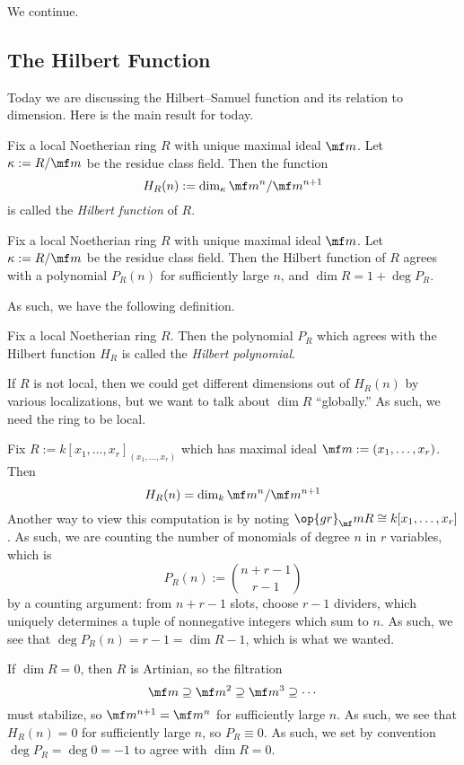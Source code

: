 
We continue.

\subsection{The Hilbert Function}
Today we are discussing the Hilbert--Samuel function and its relation to dimension. Here is the main result for today.
\begin{definition}
	Fix a local Noetherian ring $R$ with unique maximal ideal $\mf m$. Let $\kappa:=R/\mf m$ be the residue class field. Then the function
	\[H_R(n):=\dim_\kappa\mf m^n/\mf m^{n+1}\]
	is called the \textit{Hilbert function} of $R$.
\end{definition}
\begin{theorem} \label{thm:hilpoly}
	Fix a local Noetherian ring $R$ with unique maximal ideal $\mf m$. Let $\kappa:=R/\mf m$ be the residue class field. Then the Hilbert function of $R$ agrees with a polynomial $P_R(n)$ for sufficiently large $n$, and $\dim R=1+\deg P_R$.
\end{theorem}
As such, we have the following definition.
\begin{definition}
	Fix a local Noetherian ring $R$. Then the polynomial $P_R$ which agrees with the Hilbert function $H_R$ is called the \textit{Hilbert polynomial}.
\end{definition}
\begin{remark}
	If $R$ is not local, then we could get different dimensions out of $H_R(n)$ by various localizations, but we want to talk about $\dim R$ ``globally.'' As such, we need the ring to be local.
\end{remark}
\begin{example}
	Fix $R:=k[x_1,\ldots,x_r]_{(x_1,\ldots,x_r)}$ which has maximal ideal $\mf m:=(x_1,\ldots,x_r)$. Then
	\[H_R(n)=\dim_k\mf m^n/\mf m^{n+1}\]
	Another way to view this computation is by noting $\op{gr}_\mf mR\cong k[x_1,\ldots,x_r]$. As such, we are counting the number of monomials of degree $n$ in $r$ variables, which is
	\[P_R(n):=\binom{n+r-1}{r-1}\]
	by a counting argument: from $n+r-1$ slots, choose $r-1$ dividers, which uniquely determines a tuple of nonnegative integers which sum to $n$. As such, we see that $\deg P_R(n)=r-1=\dim R-1$, which is what we wanted.
\end{example}
\begin{example} \label{ex:dimzerohilpoly}
	If $\dim R=0$, then $R$ is Artinian, so the filtration
	\[\mf m\supseteq\mf m^2\supseteq\mf m^3\supseteq\cdots\]
	must stabilize, so $\mf m^{n+1}=\mf m^n$ for sufficiently large $n$. As such, we see that $H_R(n)=0$ for sufficiently large $n$, so $P_R\equiv0$. As such, we set by convention $\deg P_R=\deg0=-1$ to agree with $\dim R=0$.
\end{example}

